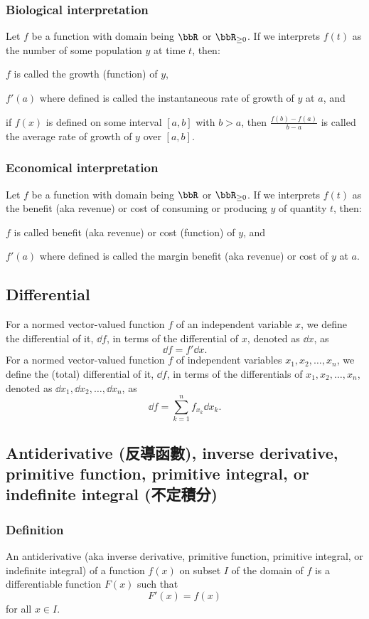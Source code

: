 \subsubsection{Biological interpretation}
Let $f$ be a function with domain being $\bbR$ or $\bbR_{\geq 0}$. If we interprets $f(t)$ as the number of some population $y$ at time $t$, then:
\bit
\item $f$ is called the growth (function) of $y$,
\item $f'(a)$ where defined is called the instantaneous rate of growth of $y$ at $a$, and
\item if $f(x)$ is defined on some interval $[a,b]$ with $b>a$, then $\frac{f(b)-f(a)}{b-a}$ is called the average rate of growth of $y$ over $[a,b]$.
\eit
\subsubsection{Economical interpretation}
Let $f$ be a function with domain being $\bbR$ or $\bbR_{\geq 0}$. If we interprets $f(t)$ as the benefit (aka revenue) or cost of consuming or producing $y$ of quantity $t$, then:
\bit
\item $f$ is called benefit (aka revenue) or cost (function) of $y$, and
\item $f'(a)$ where defined is called the margin benefit (aka revenue) or cost of $y$ at $a$.
\eit
\subsection{Differential}
For a normed vector-valued function $f$ of an independent variable $x$, we define the differential of it, $\dd{f}$, in terms of the differential of $x$, denoted as $\dd{x}$, as
\[\dd{f}=f'\dd{x}.\]
For a normed vector-valued function $f$ of independent variables $x_1,x_2,\ldots,x_n$, we define the (total) differential of it, $\dd{f}$, in terms of the differentials of $x_1,x_2,\ldots,x_n$, denoted as $\dd{x_1},\dd{x_2},\ldots,\dd{x_n}$, as
\[\dd{f}=\sum_{k=1}^nf_{x_k}\dd{x_k}.\]
\subsection{Antiderivative (反導函數), inverse derivative, primitive function, primitive integral, or indefinite integral (不定積分)}
\subsubsection{Definition}
An antiderivative (aka inverse derivative, primitive function, primitive integral, or indefinite integral) of a function $f(x)$ on subset $I$ of the domain of $f$ is a differentiable function $F(x)$ such that
\[F'(x)=f(x)\]
for all $x\in I$.

